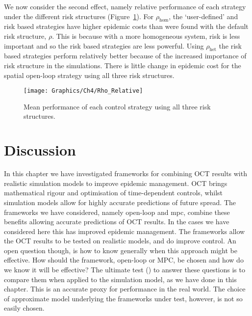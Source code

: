 We now consider the second effect, namely relative performance of each strategy under the different risk structures (Figure~\ref{fig:ch4:rho_relative}). For $\rho_{\mathrm{hom}}$, the `user-defined' and risk based strategies have higher epidemic costs than were found with the default risk structure, $\rho$. This is because with a more homogeneous system, risk is less important and so the risk based strategies are less powerful. Using $\rho_{\mathrm{het}}$ the risk based strategies perform relatively better because of the increased importance of risk structure in the simulations. There is little change in epidemic cost for the spatial open-loop strategy using all three risk structures.

\begin{figure}[h]
    \begin{center}
        \texttt{[image: Graphics/Ch4/Rho\_Relative]}
        \caption{Mean performance of each control strategy using all three risk structures.}
        \label{fig:ch4:rho_relative}
    \end{center}
\end{figure}

\FloatBarrier

\section{Discussion\label{sec:ch4:Discussion}}

In this chapter we have investigated frameworks for combining OCT results with realistic simulation models to improve epidemic management. OCT brings mathematical rigour and optimisation of time-dependent controls, whilst simulation models allow for highly accurate predictions of future spread. The frameworks we have considered, namely open-loop and mpc, combine these benefits allowing accurate predictions of OCT results. In the cases we have considered here this has improved epidemic management. The frameworks allow the OCT results to be tested on realistic models, and do improve control. An open question though, is how to know generally when this approach might be effective. How should the framework, open-loop or MPC, be chosen and how do we know it will be effective? The ultimate test () to answer these questions is to compare them when applied to the simulation model, as we have done in this chapter. This is an accurate proxy for performance in the real world. The choice of approximate model underlying the frameworks under test, however, is not so easily chosen.

